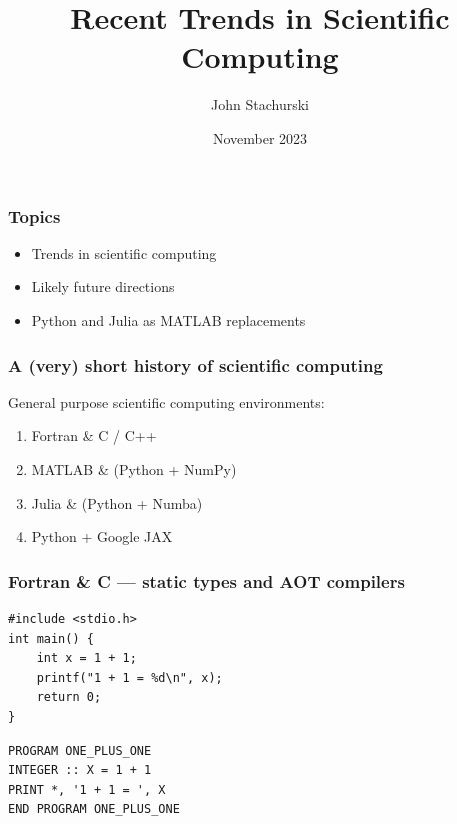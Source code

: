 \documentclass[
    xcolor={svgnames,dvipsnames},
    hyperref={colorlinks, citecolor=DeepPink4, linkcolor=DarkRed, urlcolor=DarkBlue}
    ]{beamer}  %
\title{Recent Trends in Scientific Computing}
\author{John Stachurski}
\date{November 2023}
\newcommand{\1}{\mathbbm 1}
\begin{document}
\begin{frame}
  \titlepage
\end{frame}







\begin{frame}
    \frametitle{Topics}

    \begin{itemize}
        \item Trends in scientific computing
        \vspace{0.5em}
        \item Likely future directions
        \vspace{0.5em}
        \item Python and Julia as MATLAB replacements
    \end{itemize}

\end{frame}



\begin{frame}
    \frametitle{A (very) short history of scientific computing}


    General purpose scientific computing environments:

        \vspace{0.5em}
        \vspace{0.5em}
    \begin{enumerate}
        \item Fortran \& C / C++ 
        \vspace{0.5em}
        \vspace{0.5em}
        \item MATLAB \& (Python + NumPy)
        \vspace{0.5em}
        \vspace{0.5em}
        \item Julia \& (Python + Numba) 
        \vspace{0.5em}
        \vspace{0.5em}
        \item Python + Google JAX 
    \end{enumerate}

\end{frame}



\begin{frame}[fragile]
    \frametitle{Fortran \& C --- static types and AOT compilers}

    {\small
    \begin{verbatim}
#include <stdio.h>
int main() {
    int x = 1 + 1;
    printf("1 + 1 = %d\n", x);
    return 0;
}   
    \end{verbatim}
    }


    {\small
    \begin{verbatim}
PROGRAM ONE_PLUS_ONE  
INTEGER :: X = 1 + 1 
PRINT *, '1 + 1 = ', X
END PROGRAM ONE_PLUS_ONE 
    \end{verbatim}
    }

\end{frame}
\end{document}
